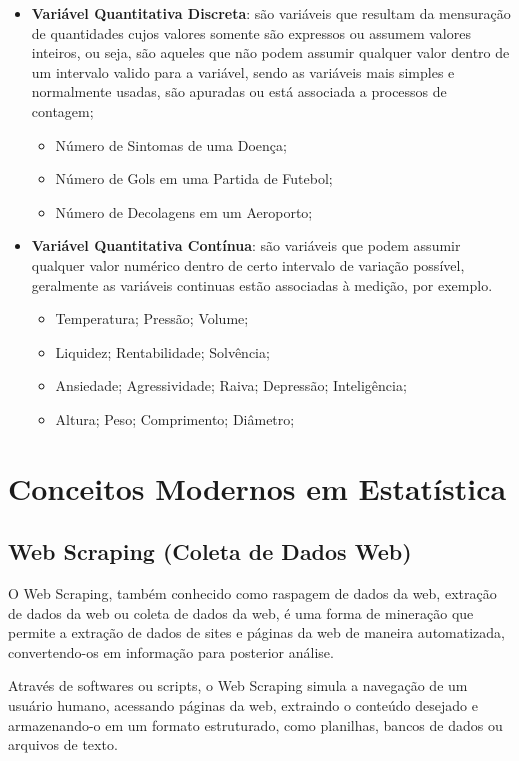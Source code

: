\begin{itemize}
  \item \textbf{Variável Quantitativa Discreta}: são variáveis que resultam da mensuração de quantidades cujos valores somente são expressos ou assumem valores inteiros, ou seja, são aqueles que não podem assumir qualquer valor dentro de um intervalo valido para a variável, sendo as variáveis mais simples e normalmente usadas, são apuradas ou está associada a processos de contagem;

 \begin{itemize}
   \item Número de Sintomas de uma Doença;
   \item Número de Gols em uma Partida de Futebol;
   \item Número de Decolagens em um Aeroporto;
 \end{itemize}
  \item \textbf{Variável Quantitativa Contínua}: são variáveis que podem assumir qualquer valor numérico dentro de certo intervalo de variação possível, geralmente as variáveis continuas estão associadas à medição, por exemplo.
\begin{itemize}
  \item Temperatura; Pressão; Volume;
  \item Liquidez; Rentabilidade; Solvência;
  \item Ansiedade; Agressividade; Raiva; Depressão; Inteligência;
  \item Altura; Peso; Comprimento; Diâmetro;
\end{itemize}
\end{itemize}


\newpage
\section{Conceitos Modernos em Estatística}

\subsection{Web Scraping (Coleta de Dados Web)}

O Web Scraping, também conhecido como raspagem de dados da web, extração de dados da web ou coleta de dados da web, é uma forma de mineração que permite a extração de dados de sites e páginas da web de maneira au\-to\-ma\-ti\-za\-da, convertendo-os em informação para posterior análise.\vskip0.3cm

Através de softwares ou scripts, o Web Scraping simula a navegação de um usuário humano, acessando páginas da web, extraindo o conteúdo desejado e armazenando-o em um formato estruturado, como planilhas, bancos de dados ou arquivos de texto.


